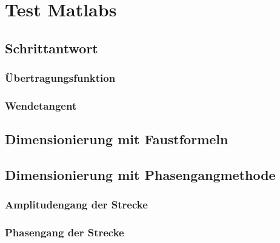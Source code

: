 \section{Test Matlabs}
\subsection{Schrittantwort}
\subsubsection{Übertragungsfunktion}
\subsubsection{Wendetangent}
\subsection{Dimensionierung mit Faustformeln}
\subsection{Dimensionierung mit  Phasengangmethode}
\subsubsection{Amplitudengang der Strecke}
\subsubsection{Phasengang der Strecke}